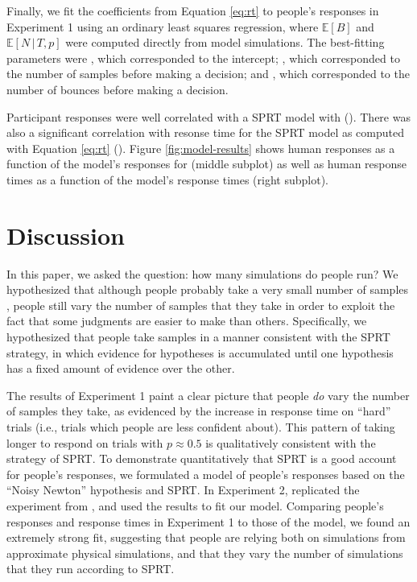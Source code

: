 \documentclass[10pt,letterpaper]{article}
\begin{document}
Finally, we fit the coefficients from Equation \ref{eq:rt} to people's responses in Experiment 1 using an ordinary least squares regression, where $\mathbb{E}[B]$ and $\mathbb{E}[N\,|\,T,p]$ were computed directly from model simulations. The best-fitting parameters were \betazero{}, which corresponded to the intercept; \betaone{}, which corresponded to the number of samples before making a decision; and \betatwo{}, which corresponded to the number of bounces before making a decision.

Participant responses were well correlated with a SPRT model with \threshold{} (\HoleResponseCorr{}). There was also a significant correlation with resonse time for the \threshold{} SPRT model as computed with Equation \ref{eq:rt} (\HoleRTCorr{}). Figure \ref{fig:model-results} shows human responses as a function of the model's responses for \threshold{} (middle subplot) as well as human response times as a function of the model's response times (right subplot).

\section{Discussion}

In this paper, we asked the question: how many simulations do people run? We hypothesized that although people probably take a very small number of samples \cite{Vul:2014ba}, people still vary the number of samples that they take in order to exploit the fact that some judgments are easier to make than others. Specifically, we hypothesized that people take samples in a manner consistent with the SPRT strategy, in which evidence for hypotheses is accumulated until one hypothesis has a fixed amount of evidence over the other.

The results of Experiment 1 paint a clear picture that people \emph{do} vary the number of samples they take, as evidenced by the increase in response time on ``hard'' trials (i.e., trials which people are less confident about). This pattern of taking longer to respond on trials with $p\approx 0.5$ is qualitatively consistent with the strategy of SPRT. To demonstrate quantitatively that SPRT is a good account for people's responses, we formulated a model of people's responses based on the ``Noisy Newton'' hypothesis and SPRT. In Experiment 2, replicated the experiment from , and used the results to fit our model. Comparing people's responses and response times in Experiment 1 to those of the model, we found an extremely strong fit, suggesting that people are relying both on simulations from approximate physical simulations, and that they vary the number of simulations that they run according to SPRT.
\end{document}
